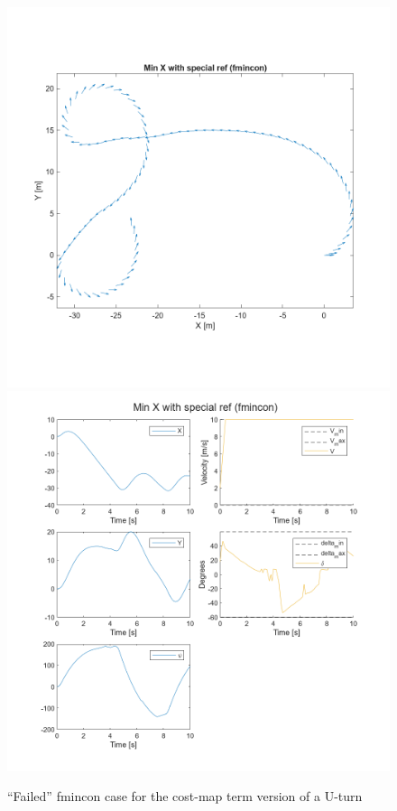 \documentclass[]{IEEEtran}
\begin{document}
\begin{figure}
    \centering
    \includegraphics[width = 0.49\columnwidth]{figs/Min_X_with_special_ref_(fmincon)_quiver.png}
    \includegraphics[width = \columnwidth]{figs/Min_X_with_special_ref_(fmincon)_traj.png}	
    \caption{``Failed'' fmincon case for the cost-map term version of a U-turn}\label{fig:Min_X_with_special_ref_fmincon}
\end{figure}
\end{document}
